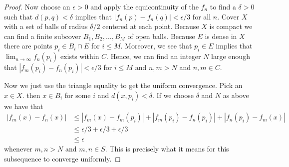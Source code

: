 \documentclass{article}
\begin{document}
\begin{proof}
  Now choose an $\epsilon > 0$ and apply the equicontinuity of the
  $f_n$ to find a $\delta > 0$ such that $d(p,q) < \delta$ implies
  that $|f_n(p) - f_n(q)| < \epsilon/3$ for all $n$. Cover $X$ with a
  set of balls of radius $\delta/2$ centered at each point. Because
  $X$ is compact we can find a finite subcover $B_1, B_2,\ldots, B_M$
  of open balls. Because $E$ is dense in $X$ there are points $p_i \in
  B_i \cap E$ for $i \leq M$. Moreover, we see that $p_i \in E$ implies
  that $\lim_{n\to\infty} f_n(p_i)$ exists within $C$. Hence, we can
  find an integer $N$ large enough that $|f_m(p_i) - f_n(p_i)| <
  \epsilon/3$ for $i \leq M$ and $n,m > N$ and $n,m \in C$.

  Now we just use the triangle equality to get the uniform
  convergence. Pick an $x\in X$. then $x \in B_i$ for some $i$ and
  $d(x,p_i) < \delta$. If we choose $\delta$ and $N$ as above we have that
  \begin{align*}
    |f_m(x) - f_n(x)| &\leq |f_m(x) - f_m(p_i)| + |f_m(p_i) -
    f_n(p_i)| + |f_n(p_i) - f_m(x)| \\
    &\leq \epsilon/3 + \epsilon/3 + \epsilon/3 \\
    &\leq \epsilon
  \end{align*}
  whenever $m,n > N$ and $m,n \in S$. This is precisely what it means
  for this subsequence to converge uniformly.
\end{proof}
\end{document}
